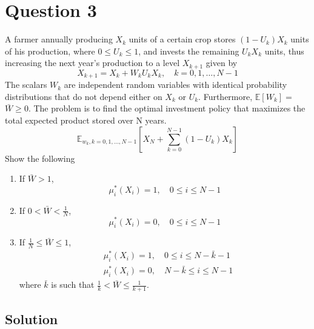 \section*{Question 3}

A farmer annually producing \( X_{k} \) units of a certain crop stores \( \left(1-U_{k}\right) X_{k} \) units of his production, where \( 0 \leq U_{k} \leq 1 \), and invests the remaining \( U_{k} X_{k} \) units, thus increasing the next year's production to a level \( X_{k+1} \) given by
\[
    X_{k+1} = X_{k}+W_{k} U_{k} X_{k}, \quad k = 0,1, \dots, N-1
\]
The scalars \( W_{k} \) are independent random variables with identical probability distributions that do not depend either on \( X_{k} \) or \( U_{k} \).
Furthermore, \( \mathbb{E}\left[W_{k}\right]= \) \( \bar{W} \geq 0 \).
The problem is to find the optimal investment policy that maximizes the total expected product stored over N years.
\[
    \mathbb{E}_{w_{k}, k = 0,1,\dots, N-1}\left[X_{N}+\sum_{k = 0}^{N-1}\left(1-U_{k}\right) X_{k}\right]
\]
Show the following
\begin{enumerate}[noitemsep, label= (\alph*)]
    \item If \( \bar{W}>1 \),
          \[
              \mu_{i}^{*}\left(X_{i}\right) = 1, \quad 0 \leq i \leq N-1
          \]

    \item If \( 0<\bar{W}<\frac{1}{N} \),
          \[
              \mu_{i}^{*}\left(X_{i}\right) = 0, \quad 0 \leq i \leq N-1
          \]

    \item If \( \frac{1}{N} \leq \bar{W} \leq 1 \),
          \[
              \begin{aligned}
                   & \mu_{i}^{*}\left(X_{i}\right) = 1, \quad 0 \leq i \leq N-\bar{k}-1 \\
                   & \mu_{i}^{*}\left(X_{i}\right) = 0, \quad N-\bar{k} \leq i \leq N-1
              \end{aligned}
          \]
          where \( \bar{k} \) is such that \( \frac{1}{k}<\bar{W} \leq \frac{1}{k+1} \).
\end{enumerate}

\subsection*{Solution}
